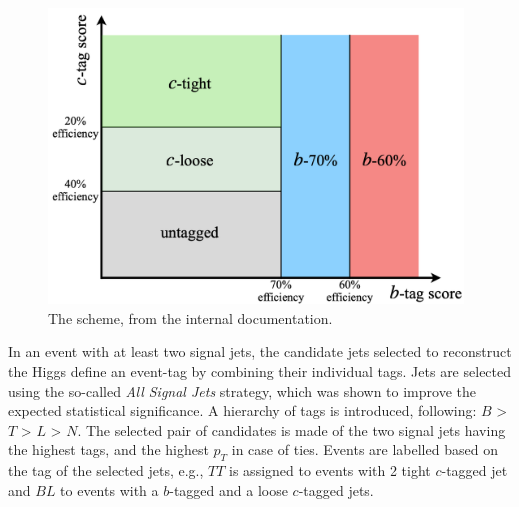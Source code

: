 \begin{figure}[h!]
    \center
      \begin{minipage}[c]{0.69\textwidth}
        \includegraphics[width=0.98\textwidth]{Images/VH/pseudocontinuous.png}
      \end{minipage}
      \begin{minipage}[c]{0.3\textwidth}
        \caption{The  scheme, from the internal documentation. } 
        \label{fig:pseudotag}
      \end{minipage}
\end{figure}

In an event with at least two signal jets, the candidate jets selected to reconstruct the Higgs define an event-tag by combining their individual tags. Jets are selected using the so-called \textit{All Signal Jets} strategy, which was shown to improve the expected statistical significance. A hierarchy of tags is introduced, following: $B$ > $T$ > $L$ > $N$. The selected pair of candidates is made of the two signal jets having the highest tags, and the highest $p_T$ in case of ties. Events are labelled based on the tag of the selected jets, e.g., $TT$ is assigned to events with 2 tight $c$-tagged jet and $BL$ to events with a $b$-tagged and a loose $c$-tagged jets. 


